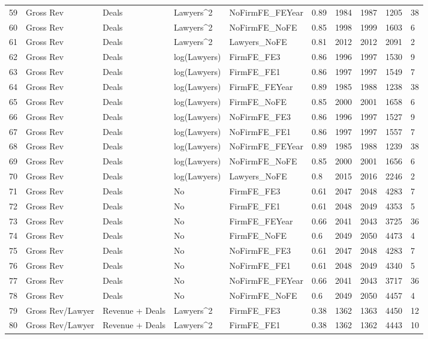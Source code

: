 \documentclass{article}
\begin{document}
\begin{table}[H]
\begin{tabular}{rlllllllll}
  59 & Gross Rev & Deals & Lawyers^2 & NoFirmFE\_FEYear & 0.89 & 1984 & 1987 & 1205 & 38 \\ 
  60 & Gross Rev & Deals & Lawyers^2 & NoFirmFE\_NoFE & 0.85 & 1998 & 1999 & 1603 & 6 \\ 
  61 & Gross Rev & Deals & Lawyers^2 & Lawyers\_NoFE & 0.81 & 2012 & 2012 & 2091 & 2 \\ 
  62 & Gross Rev & Deals & log(Lawyers) & FirmFE\_FE3 & 0.86 & 1996 & 1997 & 1530 & 9 \\ 
  63 & Gross Rev & Deals & log(Lawyers) & FirmFE\_FE1 & 0.86 & 1997 & 1997 & 1549 & 7 \\ 
  64 & Gross Rev & Deals & log(Lawyers) & FirmFE\_FEYear & 0.89 & 1985 & 1988 & 1238 & 38 \\ 
  65 & Gross Rev & Deals & log(Lawyers) & FirmFE\_NoFE & 0.85 & 2000 & 2001 & 1658 & 6 \\ 
  66 & Gross Rev & Deals & log(Lawyers) & NoFirmFE\_FE3 & 0.86 & 1996 & 1997 & 1527 & 9 \\ 
  67 & Gross Rev & Deals & log(Lawyers) & NoFirmFE\_FE1 & 0.86 & 1997 & 1997 & 1557 & 7 \\ 
  68 & Gross Rev & Deals & log(Lawyers) & NoFirmFE\_FEYear & 0.89 & 1985 & 1988 & 1239 & 38 \\ 
  69 & Gross Rev & Deals & log(Lawyers) & NoFirmFE\_NoFE & 0.85 & 2000 & 2001 & 1656 & 6 \\ 
  70 & Gross Rev & Deals & log(Lawyers) & Lawyers\_NoFE & 0.8 & 2015 & 2016 & 2246 & 2 \\ 
  71 & Gross Rev & Deals & No & FirmFE\_FE3 & 0.61 & 2047 & 2048 & 4283 & 7 \\ 
  72 & Gross Rev & Deals & No & FirmFE\_FE1 & 0.61 & 2048 & 2049 & 4353 & 5 \\ 
  73 & Gross Rev & Deals & No & FirmFE\_FEYear & 0.66 & 2041 & 2043 & 3725 & 36 \\ 
  74 & Gross Rev & Deals & No & FirmFE\_NoFE & 0.6 & 2049 & 2050 & 4473 & 4 \\ 
  75 & Gross Rev & Deals & No & NoFirmFE\_FE3 & 0.61 & 2047 & 2048 & 4283 & 7 \\ 
  76 & Gross Rev & Deals & No & NoFirmFE\_FE1 & 0.61 & 2048 & 2049 & 4340 & 5 \\ 
  77 & Gross Rev & Deals & No & NoFirmFE\_FEYear & 0.66 & 2041 & 2043 & 3717 & 36 \\ 
  78 & Gross Rev & Deals & No & NoFirmFE\_NoFE & 0.6 & 2049 & 2050 & 4457 & 4 \\ 
  79 & Gross Rev/Lawyer & Revenue + Deals & Lawyers^2 & FirmFE\_FE3 & 0.38 & 1362 & 1363 & 4450 & 12 \\ 
  80 & Gross Rev/Lawyer & Revenue + Deals & Lawyers^2 & FirmFE\_FE1 & 0.38 & 1362 & 1362 & 4443 & 10 \\ 
   \hline
\end{tabular}
\end{table}
\end{document}
